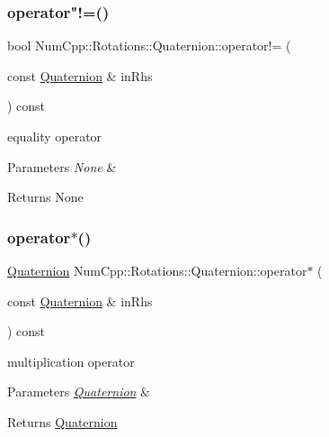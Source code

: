 \subsubsection{\texorpdfstring{operator"!=()}{operator!=()}}
{\footnotesize\ttfamily bool Num\+Cpp\+::\+Rotations\+::\+Quaternion\+::operator!= (\begin{DoxyParamCaption}\item[{const \mbox{\hyperlink{class_num_cpp_1_1_rotations_1_1_quaternion}{Quaternion}} \&}]{in\+Rhs }\end{DoxyParamCaption}) const\hspace{0.3cm}{\ttfamily [inline]}}

equality operator


\begin{DoxyParams}{Parameters}
{\em None} & \\
\hline
\end{DoxyParams}
\begin{DoxyReturn}{Returns}
None 
\end{DoxyReturn}
\mbox{\label{class_num_cpp_1_1_rotations_1_1_quaternion_a101006c45b6c33b3a251bbbc9169359f}} 
\subsubsection{\texorpdfstring{operator$\ast$()}{operator*()}\hspace{0.1cm}{\footnotesize\ttfamily [1/3]}}
{\footnotesize\ttfamily \mbox{\hyperlink{class_num_cpp_1_1_rotations_1_1_quaternion}{Quaternion}} Num\+Cpp\+::\+Rotations\+::\+Quaternion\+::operator$\ast$ (\begin{DoxyParamCaption}\item[{const \mbox{\hyperlink{class_num_cpp_1_1_rotations_1_1_quaternion}{Quaternion}} \&}]{in\+Rhs }\end{DoxyParamCaption}) const\hspace{0.3cm}{\ttfamily [inline]}}

multiplication operator


\begin{DoxyParams}{Parameters}
{\em \mbox{\hyperlink{class_num_cpp_1_1_rotations_1_1_quaternion}{Quaternion}}} & \\
\hline
\end{DoxyParams}
\begin{DoxyReturn}{Returns}
\mbox{\hyperlink{class_num_cpp_1_1_rotations_1_1_quaternion}{Quaternion}} 
\end{DoxyReturn}
\mbox{\label{class_num_cpp_1_1_rotations_1_1_quaternion_ac08faed4f8f2dbc2f0b74fed747ada01}} 
